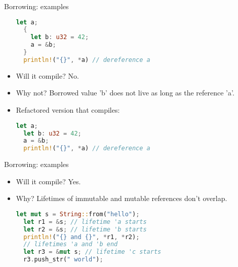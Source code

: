 \documentclass[handout]{beamer}
\begin{document}
\begin{frame}[fragile]{Borrowing: examples}
\begin{itemize}
  \begin{lstlisting}[language=Rust]
  let a;
  {
    let b: u32 = 42;
    a = &b;
  }
  println!("{}", *a) // dereference a
  \end{lstlisting}

  \item Will it compile? \pause No.
  \item Why not? \pause Borrowed value 'b' does not live as long as the reference 'a'.
  \item Refactored version that compiles:\pause

  \begin{lstlisting}[language=Rust]
  let a;
  let b: u32 = 42;
  a = &b;
  println!("{}", *a) // dereference a
  \end{lstlisting}
\end{itemize}
\end{frame}


\begin{frame}[fragile]{Borrowing: examples}
\begin{itemize}
  \begin{lstlisting}[language=Rust]
  let mut s = String::from("hello");
  let r1 = &s;
  let r2 = &s;
  println!("{} and {}", *r1, *r2);
  let r3 = &mut s;
  r3.push_str(" world");
  \end{lstlisting}

  \item Will it compile? \pause Yes.
  \item Why? \pause Lifetimes of immutable and mutable references don't overlap.

  \begin{lstlisting}[language=Rust]
  let mut s = String::from("hello");
  let r1 = &s; // lifetime 'a starts
  let r2 = &s; // lifetime 'b starts
  println!("{} and {}", *r1, *r2);
  // lifetimes 'a and 'b end
  let r3 = &mut s; // lifetime 'c starts
  r3.push_str(" world");
  \end{lstlisting}
\end{itemize}
\end{frame}
\end{document}
